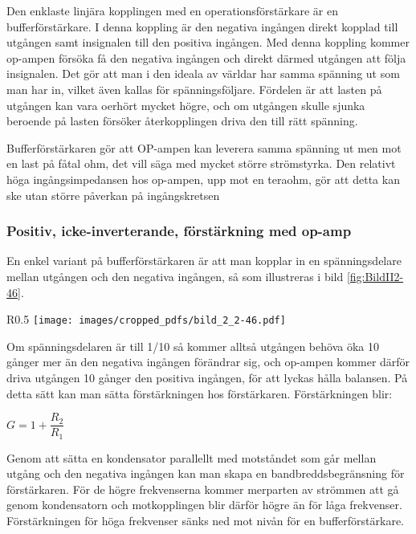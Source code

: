 Den enklaste linjära kopplingen med en operationsförstärkare är en
bufferförstärkare.
I denna koppling är den negativa ingången direkt kopplad till utgången
samt insignalen till den positiva ingången.
Med denna koppling kommer op-ampen försöka få den negativa ingången och direkt
därmed utgången att följa insignalen.
Det gör att man i den ideala av världar har samma spänning ut som man har in,
vilket även kallas för spänningsföljare.
Fördelen är att lasten på utgången kan vara oerhört mycket högre, och
om utgången skulle sjunka beroende på lasten försöker återkopplingen driva den
till rätt spänning.

Bufferförstärkaren gör att OP-ampen kan leverera samma spänning ut men mot en
last på fåtal ohm, det vill säga med mycket större strömstyrka.
Den relativt höga ingångsimpedansen hos op-ampen, upp mot en teraohm, gör att detta
kan ske utan större påverkan på ingångskretsen 

\subsubsection{Positiv, icke-inverterande, förstärkning med op-amp}
\label{icke-inverterande förstärkning}

En enkel variant på bufferförstärkaren är att man kopplar in en spänningsdelare
mellan utgången och den negativa ingången, så som illustreras i bild
\ref{fig:BildII2-46}.

\begin{wrapfigure}{R}{0.5\textwidth}
	\texttt{[image: images/cropped\_pdfs/bild\_2\_2-46.pdf]}
	\caption{Icke-inverterande förstärkare}
	\label{fig:BildII2-46}
\end{wrapfigure}

Om spänningsdelaren är till 1/10 så kommer alltså utgången behöva öka 10 gånger
mer än den negativa ingången förändrar sig, och op-ampen kommer därför driva
utgången 10 gånger den positiva ingången, för att lyckas hålla balansen.
På detta sätt kan man sätta förstärkningen hos förstärkaren.
Förstärkningen blir:

\(G = 1+ \dfrac{R_2}{R_1}\)

Genom att sätta en kondensator parallellt med motståndet som går mellan utgång
och den negativa ingången kan man skapa en bandbreddsbegränsning för
förstärkaren.
För de högre frekvenserna kommer merparten av strömmen att gå genom
kondensatorn och motkopplingen blir därför högre än för låga frekvenser.
Förstärkningen för höga frekvenser sänks ned mot nivån för en bufferförstärkare.

